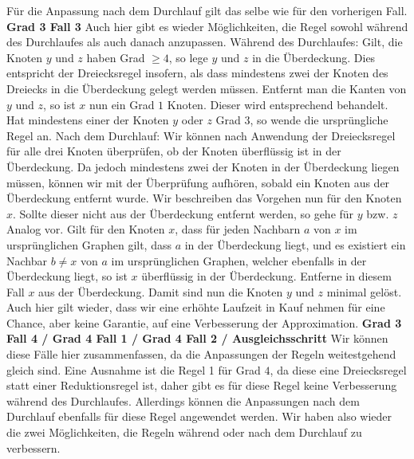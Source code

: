 \documentclass[12pt,onecolumn, notitlepage]{scrartcl}
\begin{document}
Für die Anpassung nach dem Durchlauf gilt das selbe wie für den vorherigen Fall.\newline \newline
\textbf{Grad 3 Fall 3}\newline
Auch hier gibt es wieder Möglichkeiten, die Regel sowohl während des Durchlaufes als auch danach anzupassen. \newline
Während des Durchlaufes:\newline
Gilt, die Knoten $y$ und $z$ haben Grad $\geq 4$, so lege $y$ und $z$ in die Überdeckung. Dies entspricht der Dreiecksregel insofern, als dass mindestens zwei der Knoten des Dreiecks in die Überdeckung gelegt werden müssen. Entfernt man die Kanten von $y$ und $z$, so ist $x$ nun ein Grad $1$ Knoten. Dieser wird entsprechend behandelt. Hat mindestens einer der Knoten $y$ oder $z$ Grad $3$, so wende die ursprüngliche Regel an. \newline
Nach dem Durchlauf:\newline
Wir können nach Anwendung der Dreiecksregel für alle drei Knoten überprüfen, ob der Knoten überflüssig ist in der Überdeckung. Da jedoch mindestens zwei der Knoten in der Überdeckung liegen müssen, können wir mit der Überprüfung aufhören, sobald ein Knoten aus der Überdeckung entfernt wurde. Wir beschreiben das Vorgehen nun für den Knoten $x$. Sollte dieser nicht aus der Überdeckung entfernt werden, so gehe für $y$ bzw. $z$ Analog vor.\newline
Gilt für den Knoten $x$, dass für jeden Nachbarn $a$ von $x$ im ursprünglichen Graphen gilt, dass $a$ in der Überdeckung liegt, und es existiert ein Nachbar $b \neq x$ von $a$ im ursprünglichen Graphen, welcher ebenfalls in der Überdeckung liegt, so ist $x$ überflüssig in der Überdeckung. Entferne in diesem Fall $x$ aus der Überdeckung. Damit sind nun die Knoten $y$ und $z$ minimal gelöst.\newline\newline
Auch hier gilt wieder, dass wir eine erhöhte Laufzeit in Kauf nehmen für eine Chance, aber keine Garantie, auf eine Verbesserung der Approximation.   \newline \newline
\textbf{Grad 3 Fall 4 / Grad 4 Fall 1 / Grad 4 Fall 2 / Ausgleichsschritt} \newline
Wir können diese Fälle hier zusammenfassen, da die Anpassungen der Regeln weitestgehend gleich sind. Eine Ausnahme ist die Regel 1 für Grad $4$, da diese eine Dreiecksregel statt einer Reduktionsregel ist, daher gibt es für diese Regel keine Verbesserung während des Durchlaufes. Allerdings können die Anpassungen nach dem Durchlauf ebenfalls für diese Regel angewendet werden. Wir haben also wieder die zwei Möglichkeiten, die Regeln während oder nach dem Durchlauf zu verbessern.\newline
\end{document}
